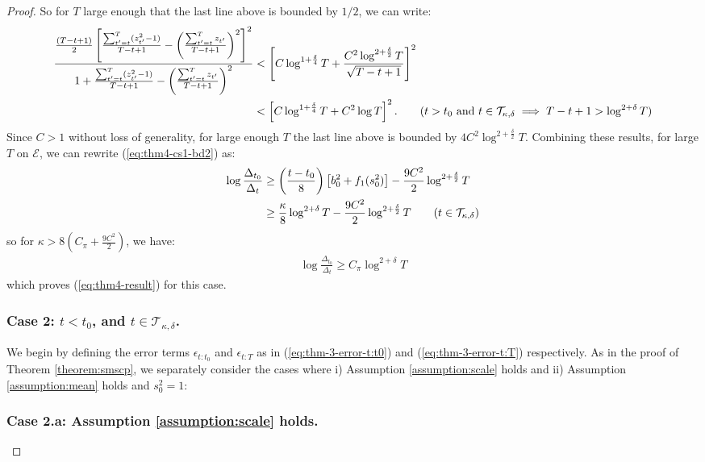 \begin{proof}
So for $T$ large enough that the last line above is bounded by $1/2$, we can write:
\begin{align*}
    \frac{\frac{(T-t+1)}{2}\left[\frac{\sum_{t'=t}^T (z_{t'}^2-1)}{T-t+1} - \left(\frac{\sum_{t'=t}^T z_{t'}}{T-t+1}\right)^2 \right]^2}{1 + \frac{\sum_{t'=t}^T (z_{t'}^2-1)}{T-t+1} - \left(\frac{\sum_{t'=t}^T z_{t'}}{T-t+1}\right)^2 } &< \left[C\log^{1 + \frac{\delta}{4}} T + \frac{C^2 \log^{2 + \frac{\delta}{2}} T}{\sqrt{T-t+1}} \right]^2 \\
    &< \left[C\log^{1 + \frac{\delta}{4}} T + C^2 \log T \right]^2. \tag{$t> t_0$ and $t \in \mathcal{T}_{\kappa,\delta} \implies T-t+1 > \log^{2 + \delta} T$}
\end{align*}
Since $C> 1$ without loss of generality, for large enough $T$ the last line above is bounded by $4C^2 \log^{2+\frac{\delta}{2} }T$. Combining these results, for large $T$ on $\mathcal{E}$, we can rewrite (\ref{eq:thm4-cs1-bd2}) as:
\begin{align*}
    \log \frac{\Delta_{t_0}}{\Delta_t} &\geq \left(\frac{t-t_0}{8}\right)\left[b_0^2 + f_1(s_0^2)\right]- \frac{9C^2}{2} \log^{2+\frac{\delta}{2} }T \\
    &\geq \frac{\kappa}{8}\log^{2+\delta} T - \frac{9C^2}{2} \log^{2+\frac{\delta}{2}} T \tag{$t\in \mathcal{T}_{\kappa,\delta}$}
\end{align*}
so for $\kappa > 8\left(C_\pi + \frac{9C^2}{2}\right)$, we have:
\begin{align*}
    \log \frac{\Delta_{t_0}}{\Delta_t} \geq C_\pi \log^{2+\delta} T
\end{align*}
which proves (\ref{eq:thm4-result}) for this case.

\subsubsection*{Case 2: $t < t_0$, and $t \in \mathcal{T}_{\kappa,\delta}$.}

We begin by defining the error terms $\epsilon_{t:t_0}$ and $\epsilon_{t:T}$ as in (\ref{eq:thm-3-error-t:t0}) and (\ref{eq:thm-3-error-t:T}) respectively. As in the proof of Theorem \ref{theorem:smscp}, we separately consider the cases where i) Assumption \ref{assumption:scale} holds and ii) Assumption \ref{assumption:mean} holds and $s_0^2 =1$:

\subsubsection*{Case 2.a: Assumption \ref{assumption:scale} holds.}


\end{proof}
